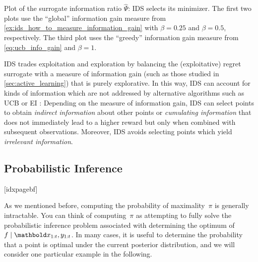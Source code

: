 \begin{marginfigure}
  \caption{Plot of the surrogate information ratio $\widehat{\Psi}$: IDS selects its minimizer. The first two plots use the ``global'' information gain measure from \cref{ex:ids_how_to_measure_information_gain} with $\beta = 0.25$ and $\beta = 0.5$, respectively. The third plot uses the ``greedy'' information gain measure from \cref{eq:ucb_info_gain} and $\beta = 1$.}\label{fig:ids}
\end{marginfigure}

IDS trades exploitation and exploration by balancing the (exploitative) regret surrogate with a measure of information gain (such as those studied in \cref{sec:active_learning}) that is purely explorative.
In this way, IDS can account for kinds of information which are not addressed by alternative algorithms such as UCB or EI \citep{russo2014learning}:
Depending on the measure of information gain, IDS can select points to obtain \emph{indirect information} about other points or \emph{cumulating information} that does not immediately lead to a higher reward but only when combined with subsequent observations.
Moreover, IDS avoids selecting points which yield \emph{irrelevant information}.

\subsection{Probabilistic Inference}[idxpagebf]

As we mentioned before, computing the probability of maximality~$\pi$ is generally intractable.
You can think of computing~$\pi$ as attempting to fully solve the probabilistic inference problem associated with determining the optimum of ${f \mid \vx_{1:t}, y_{1:t}}$.
In many cases, it is useful to determine the probability that a point is optimal under the current posterior distribution, and we will consider one particular example in the following.

